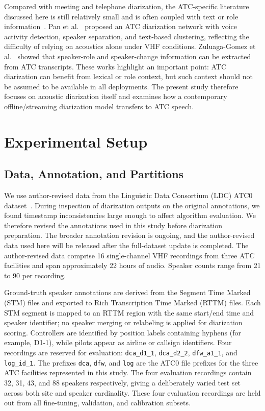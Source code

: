 \documentclass[conference]{IEEEtran}
\begin{document}
Compared with meeting and telephone diarization, the ATC-specific literature discussed here is still relatively small and is often coupled with text or role information~\cite{pan2024atcsd, zuluaga2022bertraffic}. Pan et al.~\cite{pan2024atcsd} proposed an ATC diarization network with voice activity detection, speaker separation, and text-based clustering, reflecting the difficulty of relying on acoustics alone under VHF conditions. Zuluaga-Gomez et al.~\cite{zuluaga2022bertraffic} showed that speaker-role and speaker-change information can be extracted from ATC transcripts. These works highlight an important point: ATC diarization can benefit from lexical or role context, but such context should not be assumed to be available in all deployments. The present study therefore focuses on acoustic diarization itself and examines how a contemporary offline/streaming diarization model transfers to ATC speech.

\section{Experimental Setup}
\label{sec:setup}

\subsection{Data, Annotation, and Partitions}

We use author-revised data from the Linguistic Data Consortium (LDC) ATC0 dataset~\cite{godfrey1994atcc}. During inspection of diarization outputs on the original annotations, we found timestamp inconsistencies large enough to affect algorithm evaluation. We therefore revised the annotations used in this study before diarization preparation. The broader annotation revision is ongoing, and the author-revised data used here will be released after the full-dataset update is completed. The author-revised data comprise 16 single-channel VHF recordings from three ATC facilities and span approximately 22 hours of audio. Speaker counts range from 21 to 90 per recording.

Ground-truth speaker annotations are derived from the Segment Time Marked (STM) files and exported to Rich Transcription Time Marked (RTTM) files. Each STM segment is mapped to an RTTM region with the same start/end time and speaker identifier; no speaker merging or relabeling is applied for diarization scoring. Controllers are identified by position labels containing hyphens (for example, D1-1), while pilots appear as airline or callsign identifiers. Four recordings are reserved for evaluation: \texttt{dca\_d1\_1}, \texttt{dca\_d2\_2}, \texttt{dfw\_a1\_1}, and \texttt{log\_id\_1}. The prefixes \texttt{dca}, \texttt{dfw}, and \texttt{log} are the ATC0 file prefixes for the three ATC facilities represented in this study. The four evaluation recordings contain 32, 31, 43, and 88 speakers respectively, giving a deliberately varied test set across both site and speaker cardinality.
These four evaluation recordings are held out from all fine-tuning, validation, and calibration subsets.
\end{document}
